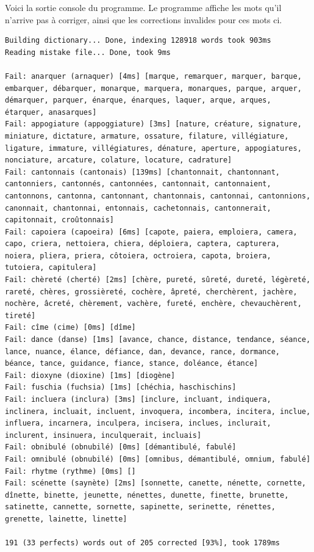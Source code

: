 \documentclass[french,12pt,a4]{report}
\begin{document}
Voici la sortie console du programme. Le programme affiche les mots
qu'il n'arrive pas à corriger, ainsi que les corrections invalides
pour ces mots ci.

\begin{verbatim}
Building dictionary... Done, indexing 128918 words took 903ms
Reading mistake file... Done, took 9ms

Fail: anarquer (arnaquer) [4ms] [marque, remarquer, marquer, barque,
embarquer, débarquer, monarque, marquera, monarques, parque, arquer,
démarquer, parquer, énarque, énarques, laquer, arque, arques,
étarquer, anasarques]
Fail: appogiature (appoggiature) [3ms] [nature, créature, signature,
miniature, dictature, armature, ossature, filature, villégiature,
ligature, immature, villégiatures, dénature, aperture, appogiatures,
nonciature, arcature, colature, locature, cadrature]
Fail: cantonnais (cantonais) [139ms] [chantonnait, chantonnant,
cantonniers, cantonnés, cantonnées, cantonnait, cantonnaient,
cantonnons, cantonna, cantonnant, chantonnais, cantonnai, cantonnions,
canonnait, chantonnai, entonnais, cachetonnais, cantonnerait,
capitonnait, croûtonnais]
Fail: capoiera (capoeira) [6ms] [capote, paiera, emploiera, camera,
capo, criera, nettoiera, chiera, déploiera, captera, capturera,
noiera, pliera, priera, côtoiera, octroiera, capota, broiera,
tutoiera, capitulera]
Fail: chèreté (cherté) [2ms] [chère, pureté, sûreté, dureté, légèreté,
rareté, chères, grossièreté, cochère, âpreté, cherchèrent, jachère,
nochère, âcreté, chèrement, vachère, fureté, enchère, chevauchèrent,
tireté]
Fail: cîme (cime) [0ms] [dîme]
Fail: dance (danse) [1ms] [avance, chance, distance, tendance, séance,
lance, nuance, élance, défiance, dan, devance, rance, dormance,
béance, tance, guidance, fiance, stance, doléance, étance]
Fail: dioxyne (dioxine) [1ms] [diogène]
Fail: fuschia (fuchsia) [1ms] [chéchia, haschischins]
Fail: incluera (inclura) [3ms] [inclure, incluant, indiquera,
inclinera, incluait, incluent, invoquera, incombera, incitera, inclue,
influera, incarnera, inculpera, incisera, inclues, inclurait,
inclurent, insinuera, inculquerait, incluais]
Fail: obnibulé (obnubilé) [0ms] [démantibulé, fabulé]
Fail: omnibulé (obnubilé) [0ms] [omnibus, démantibulé, omnium, fabulé]
Fail: rhytme (rythme) [0ms] []
Fail: scénette (saynète) [2ms] [sonnette, canette, nénette, cornette,
dînette, binette, jeunette, nénettes, dunette, finette, brunette,
satinette, cannette, sornette, sapinette, serinette, rénettes,
grenette, lainette, linette]

191 (33 perfects) words out of 205 corrected [93%], took 1789ms
\end{verbatim}
\end{document}

